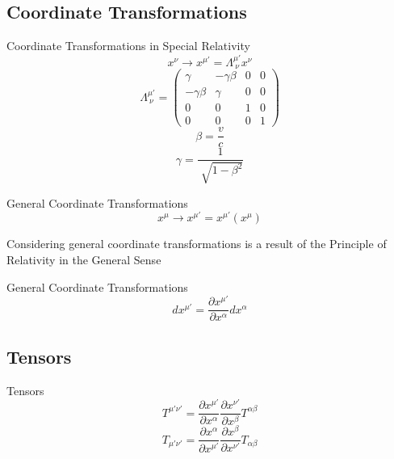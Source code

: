 \documentclass{beamer}
\begin{document}
\begin{darkframes}
	\subsection{Coordinate Transformations} 
    	\begin{frame}{Coordinate Transformations in Special Relativity}
        	$$ x^{\nu} \longrightarrow x^{\mu'} = \Lambda^{\mu'}_{\ \nu} x^{\nu} $$
            \pause
            $$ \Lambda^{\mu'}_{\ \nu} = \left( \begin{array}{cccc}
          		\gamma & -\gamma \beta & 0 & 0 \\
           		-\gamma \beta & \gamma & 0 & 0\\
           		0 & 0 & 1 & 0\\ 
           		0 & 0 & 0 & 1
          	\end{array}\right) $$
            \pause
            $$ \beta = \frac{v}{c} $$
            \pause
            $$ \gamma = \frac{1}{\sqrt[]{1 - \beta^{2}}} $$
    	\end{frame}
        
        \begin{frame}{General Coordinate Transformations}
        	$$ x^{\mu} \longrightarrow x^{\mu'} = x^{\mu'} \left( x^{\mu} \right) $$
            \pause
            \bigskip 
            
            \centering
            {Considering general coordinate transformations is a result of the Principle of Relativity in the General Sense}
    	\end{frame}
        
    	\begin{frame}{General Coordinate Transformations}
    		$$ dx^{\mu'} = \frac{\partial x^{\mu'}}{\partial x^{\alpha}}dx^{\alpha} $$
    	\end{frame}
        
    \subsection{Tensors}
    	\begin{frame}{Tensors}
    		$$ T^{\mu' \nu'} = \frac{\partial x^{\mu'}}{\partial x^{\alpha}} 		
            \frac{\partial x^{\nu'}}{\partial x^{\beta}} T^{\alpha \beta} $$
            \pause
            $$ T_{\mu' \nu'} = \frac{\partial x^{\alpha}}{\partial x^{\mu'}} 		
            \frac{\partial x^{\beta}}{\partial x^{\nu'}} T_{\alpha \beta} $$
    	\end{frame}
    

\end{darkframes}
\end{document}
